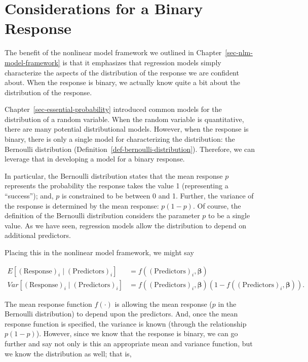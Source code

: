 \documentclass[
  letterpaper,
  DIV=11,
  numbers=noendperiod]{scrreprt}
\theoremstyle{definition}
\theoremstyle{definition}
\theoremstyle{remark}
\begin{document}
\hypertarget{considerations-for-a-binary-response}{%
\section{Considerations for a Binary
Response}\label{considerations-for-a-binary-response}}

The benefit of the nonlinear model framework we outlined in
Chapter~\ref{sec-nlm-model-framework} is that it emphasizes that
regression models simply characterize the aspects of the distribution of
the response we are confident about. When the response is binary, we
actually know quite a bit about the distribution of the response.

Chapter~\ref{sec-essential-probability} introduced common models for the
distribution of a random variable. When the random variable is
quantitative, there are many potential distributional models. However,
when the response is binary, there is only a single model for
characterizing the distribution: the Bernoulli distribution
(Definition~\ref{def-bernoulli-distribution}). Therefore, we can
leverage that in developing a model for a binary response.

In particular, the Bernoulli distribution states that the mean response
\(p\) represents the probability the response takes the value 1
(representing a ``success''); and, \(p\) is constrained to be between 0
and 1. Further, the variance of the response is determined by the mean
response: \(p (1 - p)\). Of course, the definition of the Bernoulli
distribution considers the parameter \(p\) to be a single value. As we
have seen, regression models allow the distribution to depend on
additional predictors.

Placing this in the nonlinear model framework, we might say

\[
\begin{aligned}
  E\left[(\text{Response})_i \mid (\text{Predictors})_i\right] 
    &= f\left((\text{Predictors})_i, \boldsymbol{\beta}\right) \\
  Var\left[(\text{Response})_i \mid (\text{Predictors})_i\right]
    &= f\left((\text{Predictors})_i, \boldsymbol{\beta}\right) \left(1 - f\left((\text{Predictors})_i, \boldsymbol{\beta}\right)\right).
\end{aligned}
\]

The mean response function \(f(\cdot)\) is allowing the mean response
(\(p\) in the Bernoulli distribution) to depend upon the predictors.
And, once the mean response function is specified, the variance is known
(through the relationship \(p (1 - p)\)). However, since we know that
the response is binary, we can go further and say not only is this an
appropriate mean and variance function, but we know the distribution as
well; that is,
\end{document}
